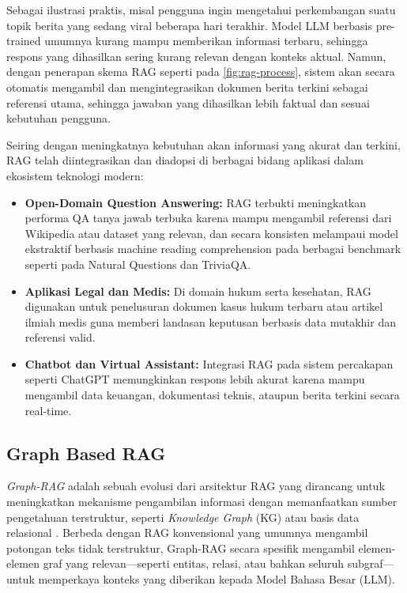 Sebagai ilustrasi praktis, misal pengguna ingin mengetahui perkembangan suatu topik berita yang sedang viral beberapa hari terakhir. Model LLM berbasis pre-trained umumnya kurang mampu memberikan informasi terbaru, sehingga respons yang dihasilkan sering kurang relevan dengan konteks aktual. Namun, dengan penerapan skema RAG seperti pada \ref{fig:rag-process}, sistem akan secara otomatis mengambil dan mengintegrasikan dokumen berita terkini sebagai referensi utama, sehingga jawaban yang dihasilkan lebih faktual dan sesuai kebutuhan pengguna.
		
Seiring dengan meningkatnya kebutuhan akan informasi yang akurat dan terkini, RAG telah diintegrasikan dan diadopsi di berbagai bidang aplikasi dalam ekosistem teknologi modern:
\begin{itemize}
	\item \textbf{Open-Domain Question Answering:} RAG terbukti meningkatkan performa QA tanya jawab terbuka karena mampu mengambil referensi dari Wikipedia atau dataset yang relevan, dan secara konsisten melampaui model ekstraktif berbasis machine reading comprehension pada berbagai benchmark seperti pada Natural Questions dan TriviaQA.
	\item \textbf{Aplikasi Legal dan Medis:} Di domain hukum serta kesehatan, RAG digunakan untuk penelusuran dokumen kasus hukum terbaru atau artikel ilmiah medis guna memberi landasan keputusan berbasis data mutakhir dan referensi valid.
	\item \textbf{Chatbot dan Virtual Assistant:} Integrasi RAG pada sistem percakapan seperti ChatGPT memungkinkan respons lebih akurat karena mampu mengambil data keuangan, dokumentasi teknis, ataupun berita terkini secara real-time.
\end{itemize}
\subsection{Graph Based RAG}
\textit{Graph-RAG} adalah sebuah evolusi dari arsitektur RAG yang dirancang untuk meningkatkan mekanisme pengambilan informasi dengan memanfaatkan sumber pengetahuan terstruktur, seperti \textit{Knowledge Graph} (KG) atau basis data relasional \cite{peng2024graphretrievalaugmentedgenerationsurvey}. Berbeda dengan RAG konvensional yang umumnya mengambil potongan teks tidak terstruktur, Graph-RAG secara spesifik mengambil elemen-elemen graf yang relevan—seperti entitas, relasi, atau bahkan seluruh subgraf—untuk memperkaya konteks yang diberikan kepada Model Bahasa Besar (LLM).

